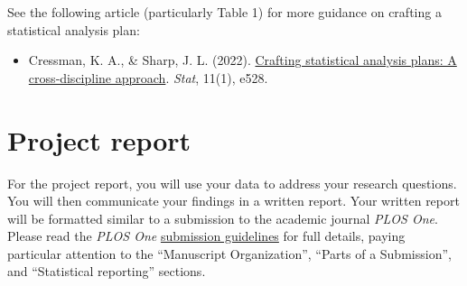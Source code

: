 \documentclass[11pt]{article}
\begin{document}
\noindent See the following article (particularly Table 1) for more guidance on crafting a statistical analysis plan:

\begin{itemize}
\item[] Cressman, K. A., \& Sharp, J. L. (2022). \href{https://onlinelibrary.wiley.com/doi/full/10.1002/sta4.528}{Crafting statistical analysis plans: A cross‐discipline approach}. \textit{Stat}, 11(1), e528.
\end{itemize}

\section*{Project report}

For the project report, you will use your data to address your research questions. You will then communicate your findings in a written report. Your written report will be formatted similar to a submission to the academic journal \textit{PLOS One}. Please read the \textit{PLOS One} \href{https://journals.plos.org/plosone/s/submission-guidelines}{submission guidelines} for full details, paying particular attention to the ``Manuscript Organization'', ``Parts of a Submission'', and ``Statistical reporting'' sections.\\
\end{document}
